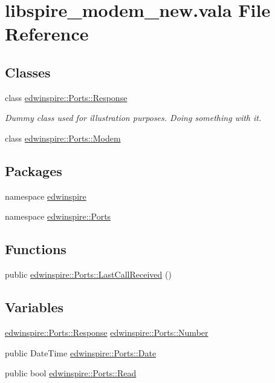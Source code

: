 \hypertarget{libspire__modem__new_8vala}{\section{libspire\-\_\-modem\-\_\-new.\-vala File Reference}
\label{libspire__modem__new_8vala}
}
\subsection*{Classes}
\begin{DoxyCompactItemize}
\item 
class \hyperlink{classedwinspire_1_1_ports_1_1_response}{edwinspire\-::\-Ports\-::\-Response}
\begin{DoxyCompactList}\small\item\em Dummy class used for illustration purposes. Doing something with it. \end{DoxyCompactList}\item 
class \hyperlink{classedwinspire_1_1_ports_1_1_modem}{edwinspire\-::\-Ports\-::\-Modem}
\end{DoxyCompactItemize}
\subsection*{Packages}
\begin{DoxyCompactItemize}
\item 
namespace \hyperlink{namespaceedwinspire}{edwinspire}
\item 
namespace \hyperlink{namespaceedwinspire_1_1_ports}{edwinspire\-::\-Ports}
\end{DoxyCompactItemize}
\subsection*{Functions}
\begin{DoxyCompactItemize}
\item 
public \hyperlink{namespaceedwinspire_1_1_ports_a1cb04d0401c5f2277711b286f3199061}{edwinspire\-::\-Ports\-::\-Last\-Call\-Received} ()
\end{DoxyCompactItemize}
\subsection*{Variables}
\begin{DoxyCompactItemize}
\item 
\hyperlink{classedwinspire_1_1_ports_1_1_response}{edwinspire\-::\-Ports\-::\-Response} \hyperlink{namespaceedwinspire_1_1_ports_a809bb99c77e120d0d3e305149731746c}{edwinspire\-::\-Ports\-::\-Number}
\item 
public Date\-Time \hyperlink{namespaceedwinspire_1_1_ports_a85143858f34117053e5460d22df04df8}{edwinspire\-::\-Ports\-::\-Date}
\item 
public bool \hyperlink{namespaceedwinspire_1_1_ports_a5efed4bf03757ef2f2356e4d58bc0b25}{edwinspire\-::\-Ports\-::\-Read}
\end{DoxyCompactItemize}
